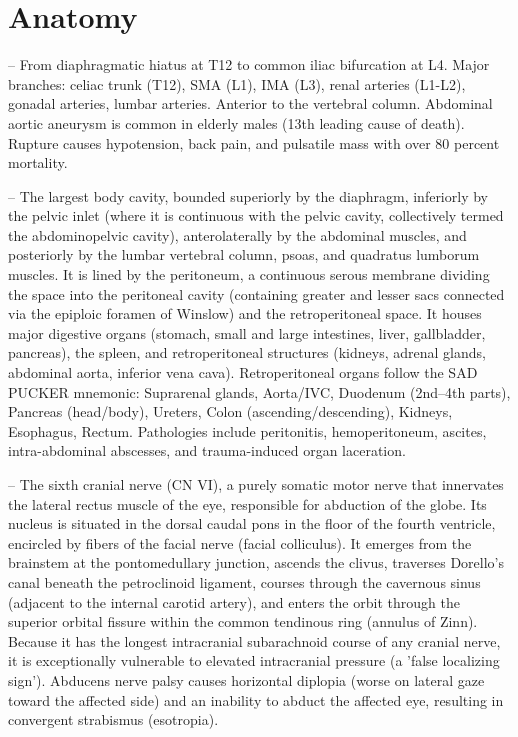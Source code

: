 \chapter{Anatomy}

-- From diaphragmatic hiatus at T12 to common iliac bifurcation at L4. Major branches: celiac trunk (T12), SMA (L1), IMA (L3), renal arteries (L1-L2), gonadal arteries, lumbar arteries. Anterior to the vertebral column. Abdominal aortic aneurysm is common in elderly males (13th leading cause of death). Rupture causes hypotension, back pain, and pulsatile mass with over 80 percent mortality.

-- The largest body cavity, bounded superiorly by the diaphragm, inferiorly by the pelvic inlet (where it is continuous with the pelvic cavity, collectively termed the abdominopelvic cavity), anterolaterally by the abdominal muscles, and posteriorly by the lumbar vertebral column, psoas, and quadratus lumborum muscles. It is lined by the peritoneum, a continuous serous membrane dividing the space into the peritoneal cavity (containing greater and lesser sacs connected via the epiploic foramen of Winslow) and the retroperitoneal space. It houses major digestive organs (stomach, small and large intestines, liver, gallbladder, pancreas), the spleen, and retroperitoneal structures (kidneys, adrenal glands, abdominal aorta, inferior vena cava). Retroperitoneal organs follow the SAD PUCKER mnemonic: Suprarenal glands, Aorta/IVC, Duodenum (2nd--4th parts), Pancreas (head/body), Ureters, Colon (ascending/descending), Kidneys, Esophagus, Rectum. Pathologies include peritonitis, hemoperitoneum, ascites, intra-abdominal abscesses, and trauma-induced organ laceration.

-- The sixth cranial nerve (CN VI), a purely somatic motor nerve that innervates the lateral rectus muscle of the eye, responsible for abduction of the globe. Its nucleus is situated in the dorsal caudal pons in the floor of the fourth ventricle, encircled by fibers of the facial nerve (facial colliculus). It emerges from the brainstem at the pontomedullary junction, ascends the clivus, traverses Dorello's canal beneath the petroclinoid ligament, courses through the cavernous sinus (adjacent to the internal carotid artery), and enters the orbit through the superior orbital fissure within the common tendinous ring (annulus of Zinn). Because it has the longest intracranial subarachnoid course of any cranial nerve, it is exceptionally vulnerable to elevated intracranial pressure (a 'false localizing sign'). Abducens nerve palsy causes horizontal diplopia (worse on lateral gaze toward the affected side) and an inability to abduct the affected eye, resulting in convergent strabismus (esotropia).

